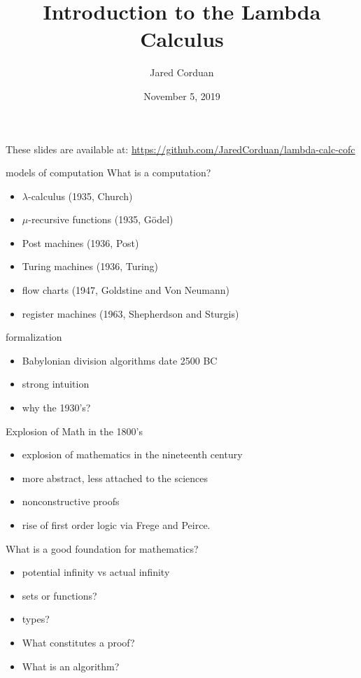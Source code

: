 \documentclass{beamer}
\title[Introduction to the Lambda Calculus]{Introduction to the Lambda Calculus}
\author[]{Jared Corduan}
\date{November 5, 2019}
\begin{document}
\begin{frame}
  \titlepage
\end{frame}

\begin{frame}
  These slides are available at:
  \url{https://github.com/JaredCorduan/lambda-calc-cofc}
\end{frame}

\begin{frame}{models of computation}
  What is a computation?

  \begin{itemize}
    \item $\lambda$-calculus (1935, Church)
    \item $\mu$-recursive functions (1935, G\"odel)
    \item Post machines (1936, Post)
    \item Turing machines (1936, Turing)
    \item flow charts (1947, Goldstine and Von Neumann)
    \item register machines (1963, Shepherdson and Sturgis)
  \end{itemize}
\end{frame}

\begin{frame}{formalization}
  \begin{itemize}
    \item Babylonian division algorithms date 2500 BC
    \item strong intuition
    \item why the 1930's?
  \end{itemize}
\end{frame}

\begin{frame}{Explosion of Math in the 1800's}
  \begin{itemize}
    \item explosion of mathematics in the nineteenth century
    \item more abstract, less attached to the sciences
    \item nonconstructive proofs
    \item rise of first order logic via Frege and Peirce.
  \end{itemize}
\end{frame}

\begin{frame}{What is a good foundation for mathematics?}
  \begin{itemize}
    \item potential infinity vs actual infinity
    \item sets or functions?
    \item types?
    \item What constitutes a proof?
    \item What is an algorithm?
  \end{itemize}
\end{frame}
\end{document}
